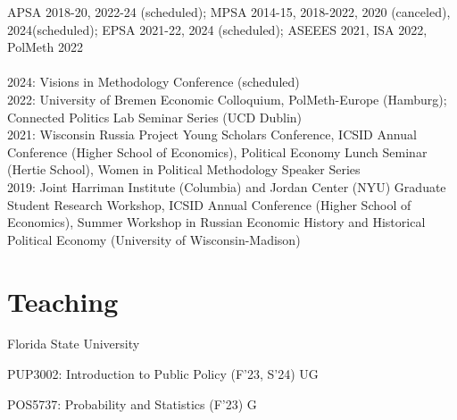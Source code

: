 \documentclass[margin,line,10.95pt]{res}
\newenvironment{list1}{
  \begin{list}{\ding{113}}{%
      \setlength{\itemsep}{0in}
      \setlength{\parsep}{0in} \setlength{\parskip}{0in}
      \setlength{\topsep}{0in} \setlength{\partopsep}{0in}
      \setlength{\leftmargin}{0.17in}}}{\end{list}}
\begin{document}
\begin{resume}
APSA 2018-20, 2022-24 (scheduled); MPSA 2014-15, 2018-2022, 2020 (canceled), 2024(scheduled); EPSA 2021-22, 2024 (scheduled); ASEEES 2021, ISA 2022, PolMeth 2022
\\
\\
2024: Visions in Methodology Conference (scheduled)\\
2022: University of Bremen Economic Colloquium, PolMeth-Europe (Hamburg); Connected Politics Lab Seminar Series (UCD Dublin)
\\
2021: Wisconsin Russia Project Young Scholars Conference, ICSID Annual Conference (Higher School of Economics), Political Economy Lunch Seminar (Hertie School), Women in Political Methodology Speaker Series
\\
2019: Joint Harriman Institute (Columbia) and Jordan Center (NYU) Graduate Student Research Workshop,  ICSID Annual Conference (Higher School of Economics), Summer Workshop in Russian Economic History and Historical Political Economy (University of Wisconsin-Madison) 


\section{\sc Teaching }

{Florida State University}\\
\vspace*{-.1in}
\begin{list1}
\item[] PUP3002: Introduction to Public Policy (F'23, S'24) UG
\item[] POS5737: Probability and Statistics (F'23) G
\end{list1}






\end{resume}
\end{document}
